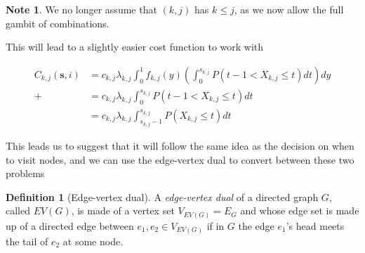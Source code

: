 \documentclass[a4paper,10pt]{article}
\theoremstyle{definition}
\newtheorem{definition}[theorem]{Definition}
\theoremstyle{definition}
\theoremstyle{remark}
\theoremstyle{definition}
\newtheorem*{note}{Note}
\begin{document}
\begin{note}
We no longer assume that $(k,j)$ has $k \leq j$, as we now allow the full gambit of combinations.
\end{note}

This will lead to a slightly easier cost function to work with

\begin{align*}
C_{k,j}(\bm{s},i)&=c_{k,j} \lambda_{k,j} \int_{0}^{1} f_{k,j}(y) \left(\int_{0}^{s_{k,j}} P(t-1 < X_{k,j} \leq t) dt \right) dy \\+
&=c_{k,j} \lambda_{k,j} \int_{0}^{s_{k,j}} P(t-1 < X_{k,j} \leq t) dt \\
&=c_{k,j} \lambda_{k,j} \int_{s_{k,j}-1}^{s_{k,j}} P(X_{k,j} \leq t) dt
\end{align*}

This leads us to suggest that it will follow the same idea as the decision on when to visit nodes, and we can use the edge-vertex dual to convert between these two problems

\begin{definition}[Edge-vertex dual]
A \textit{edge-vertex dual} of a directed graph $G$, called $EV(G)$, is made of a vertex set $V_{EV(G)}=E_{G}$ and whose edge set is made up of a directed edge between $e_{1},e_{2} \in V_{EV(G)}$ if in $G$ the edge $e_{1}$'s head meets the tail of $e_{2}$ at some node.
\end{definition}
\end{document}
